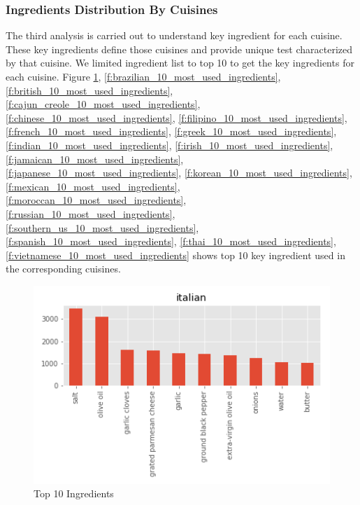 \documentclass[sigconf]{acmart}
\begin{document}
\subsubsection{Ingredients Distribution By Cuisines}
The third analysis is carried out to understand key ingredient for each cuisine. These key ingredients define those cuisines and provide unique test characterized by that cuisine. We limited ingredient list to top 10 to get the key ingredients for each cuisine. Figure \ref{f:italian_10_most_used_ingredients}, \ref{f:brazilian_10_most_used_ingredients}, \ref{f:british_10_most_used_ingredients}, \ref{f:cajun_creole_10_most_used_ingredients}, \ref{f:chinese_10_most_used_ingredients}, \ref{f:filipino_10_most_used_ingredients}, \ref{f:french_10_most_used_ingredients}, \ref{f:greek_10_most_used_ingredients}, \ref{f:indian_10_most_used_ingredients}, \ref{f:irish_10_most_used_ingredients}, \ref{f:jamaican_10_most_used_ingredients}, \ref{f:japanese_10_most_used_ingredients}, \ref{f:korean_10_most_used_ingredients}, \ref{f:mexican_10_most_used_ingredients}, \ref{f:moroccan_10_most_used_ingredients}, \ref{f:russian_10_most_used_ingredients}, \ref{f:southern_us_10_most_used_ingredients}, \ref{f:spanish_10_most_used_ingredients}, \ref{f:thai_10_most_used_ingredients}, \ref{f:vietnamese_10_most_used_ingredients}  shows top 10 key ingredient used in the corresponding cuisines. 
\begin{figure}[!ht]
  \centering\includegraphics[width=\columnwidth]{images/italian_10_most_used_ingredients.png}
  \caption{Top 10 Ingredients }\label{f:italian_10_most_used_ingredients}
\end{figure}
\end{document}
